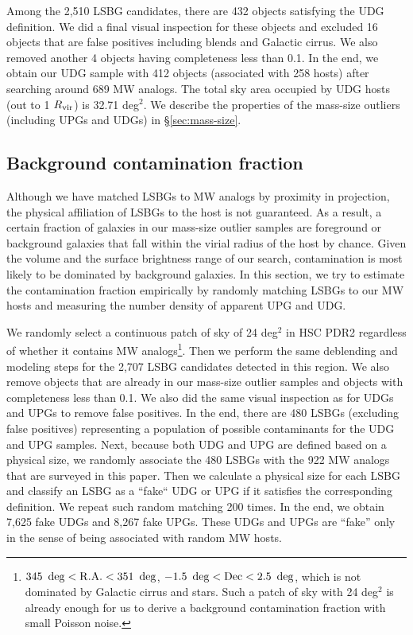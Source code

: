 \documentclass[twocolumn,astrosymb,twocolappendix]{aastex631}
\begin{document}
\begin{CJK*}{UTF8}{gbsn}
Among the 2,510 LSBG candidates, there are 432 objects satisfying the UDG definition. We did a final visual inspection for these objects and excluded 16 objects that are false positives including blends and Galactic cirrus. We also removed another 4 objects having completeness less than 0.1. In the end, we obtain our UDG sample with 412 objects (associated with 258 hosts) after searching around 689 MW analogs. The total sky area occupied by UDG hosts (out to 1 $R_{\rm{vir}}$) is 32.71 deg$^{2}$. We describe the properties of the mass-size outliers (including UPGs and UDGs) in \S\ref{sec:mass-size}.

\subsection{Background contamination fraction}\label{sec:bkg}
Although we have matched LSBGs to MW analogs by proximity in projection, the physical affiliation of LSBGs to the host is not guaranteed. As a result, a certain fraction of galaxies in our mass-size outlier samples are foreground or background galaxies that fall within the virial radius of the host by chance. Given the volume and the surface brightness range of our search, contamination is most likely to be dominated by background galaxies. In this section, we try to estimate the contamination fraction empirically by randomly matching LSBGs to our MW hosts and measuring the number density of apparent UPG and UDG.

We randomly select a continuous patch of sky of 24 deg$^{2}$ in HSC PDR2 regardless of whether it contains MW analogs\footnote{$345\ \deg < \rm{R.A.} < 351\ \deg$, $-1.5\ \deg < \rm{Dec} < 2.5\ \deg$, which is not dominated by Galactic cirrus and stars. Such a patch of sky with 24 deg$^2$ is already enough for us to derive a background contamination fraction with small Poisson noise.}. Then we perform the same deblending and modeling steps for the 2,707 LSBG candidates detected in this region. We also remove objects that are already in our mass-size outlier samples and objects with completeness less than 0.1. We also did the same visual inspection as for UDGs and UPGs to remove false positives. In the end, there are 480 LSBGs (excluding false positives) representing a population of possible contaminants for the UDG and UPG samples. Next, because both UDG and UPG are defined based on a physical size, we randomly associate the 480 LSBGs with the 922 MW analogs that are surveyed in this paper. Then we calculate a physical size for each LSBG and classify an LSBG as a ``fake`` UDG or UPG if it satisfies the corresponding definition. We repeat such random matching 200 times. In the end, we obtain 7,625 fake UDGs and 8,267 fake UPGs. These UDGs and UPGs are ``fake'' only in the sense of being associated with random MW hosts. 


\end{CJK*}
\end{document}
